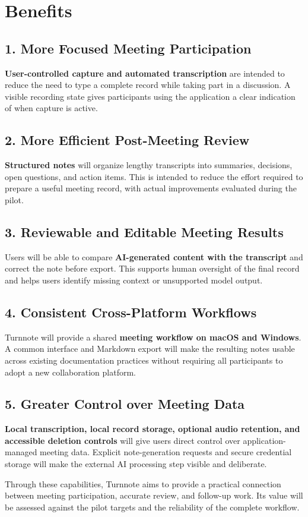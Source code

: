 \documentclass[12pt,a4paper]{article}
\begin{document}
\section*{Benefits}
\subsection*{1. More Focused Meeting Participation}
\textbf{User-controlled capture and automated transcription} are intended to reduce the need to type a complete record while taking part in a discussion. A visible recording state gives participants using the application a clear indication of when capture is active.\par
{}
\subsection*{2. More Efficient Post-Meeting Review}
\textbf{Structured notes} will organize lengthy transcripts into summaries, decisions, open questions, and action items. This is intended to reduce the effort required to prepare a useful meeting record, with actual improvements evaluated during the pilot.\par
{}
\subsection*{3. Reviewable and Editable Meeting Results}
Users will be able to compare \textbf{AI-generated content with the transcript} and correct the note before export. This supports human oversight of the final record and helps users identify missing context or unsupported model output.\par
{}
\subsection*{4. Consistent Cross-Platform Workflows}
Turnnote will provide a shared \textbf{meeting workflow on macOS and Windows}. A common interface and Markdown export will make the resulting notes usable across existing documentation practices without requiring all participants to adopt a new collaboration platform.\par
{}
\subsection*{5. Greater Control over Meeting Data}
\textbf{Local transcription, local record storage, optional audio retention, and accessible deletion controls} will give users direct control over application-managed meeting data. Explicit note-generation requests and secure credential storage will make the external AI processing step visible and deliberate.\par
Through these capabilities, Turnnote aims to provide a practical connection between meeting participation, accurate review, and follow-up work. Its value will be assessed against the pilot targets and the reliability of the complete workflow.\par
{}
\end{document}

